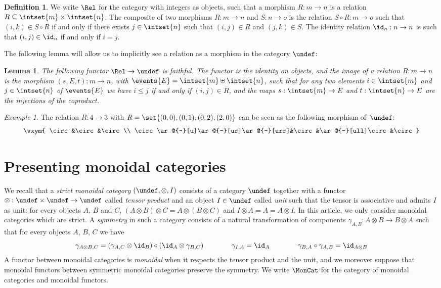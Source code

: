 \documentclass[submission,copyright,creativecommons]{eptcs}
\let\P\undef
\let\C\undef
\newtheorem{lemma}[theorem]{Lemma}
\theoremstyle{definition}
\newtheorem{definition}[theorem]{Definition}
\theoremstyle{remark}
\newtheorem{example}[theorem]{Example}
\renewcommand{\leq}{\leqslant}
\begin{document}
\begin{definition}
  \label{def:rel}
  We write $\Rel$ for the category with integers as objects, such that a
  morphism $R:m\to n$ is a relation $R\subseteq\intset{m}\times\intset{n}$. The
  composite of two morphisms $R:m\to n$ and $S:n\to o$ is the relation $S\circ
  R:m\to o$ such that $(i,k)\in S\circ R$ if and only if there exists
  $j\in\intset{n}$ such that $(i,j)\in R$ and $(j,k)\in S$. The identity
  relation $\id_n:n\to n$ is such that $(i,j)\in\id_n$ if and only if $i=j$.
\end{definition}

\noindent
The following lemma will allow us to implicitly see a relation as a morphism in
the category $\P$:

\begin{lemma}
  \label{lemma:rel-poset}
  The following functor $\Rel\to\P$ is faithful. The functor is the identity on
  objects, and the image of a relation $R:m\to n$ is the morphism $(s,E,t):m\to
  n$, with $\events{E}=\intset{m}\uplus\intset{n}$, such that for any two
  elements $i\in\intset{m}$ and $j\in\intset{n}$ of $\events{E}$ we have $i\leq
  j$ if and only if $(i,j)\in R$, and the maps $s:\intset{m}\to E$ and
  $t:\intset{n}\to E$ are the injections of the coproduct.
\end{lemma}

\begin{example}
  \label{ex:rel-P}
  The relation $R:4\to 3$ with $R=\set{(0,0),(0,1),(0,2),(2,0)}$ can be seen as
  the following morphism of~$\P$:
  \[
  \vxym{
    \circ&\circ&\circ\\
    \circ\ar@{-}[u]\ar@{-}[ur]\ar@{-}[urr]&\circ&\ar@{-}[ull]\circ&\circ
  }
  \]
\end{example}

\section{Presenting monoidal categories}
\label{sec:presenting}
We recall that a \emph{strict monoidal category} $(\C,\otimes,I)$ consists of a
category $\C$ together with a functor $\otimes:\C\times\C\to\C$ called
\emph{tensor product} and an object $I\in\C$ called \emph{unit} such that the
tensor is associative and admits $I$ as unit: for every objects $A$, $B$ and
$C$, $(A\otimes B)\otimes C=A\otimes(B\otimes C)$ and $I\otimes A=A=A\otimes
I$. In this article, we only consider monoidal categories which are strict. A
\emph{symmetry} in such a category consists of a natural transformation of
components $\gamma_{A,B}:A\otimes B\to B\otimes A$ such that for every objects
$A$, $B$, $C$ we have
\[
\gamma_{A\otimes B,C}=(\gamma_{A,C}\otimes\id_B)\circ(\id_A\otimes\gamma_{B,C})
\qquad\qquad
\gamma_{I,A}=\id_A
\qquad\qquad
\gamma_{B,A}\circ\gamma_{A,B}=\id_{A\otimes B}
\]
A functor between monoidal categories is \emph{monoidal} when it respects the
tensor product and the unit, and we moreover suppose that monoidal functors
between symmetric monoidal categories preserve the symmetry. We write $\MonCat$
for the category of monoidal categories and monoidal functors.
\end{document}
